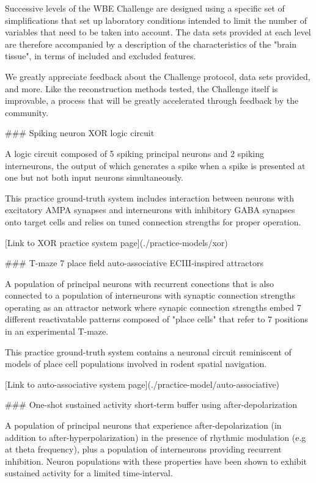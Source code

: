 \documentclass{ldr-article}
\begin{document}
Successive levels of the WBE Challenge are designed using a specific set of simplifications that
set up laboratory conditions intended to limit the number of variables that need to be taken into
account. The data sets provided at each level are therefore accompanied by a description of the
characteristics of the "brain tissue", in terms of included and excluded features.

We greatly appreciate feedback about the Challenge protocol, data sets provided, and more. Like
the reconstruction methods tested, the Challenge itself is improvable, a process that will be greatly
accelerated through feedback by the community.

### Spiking neuron XOR logic circuit

A logic circuit composed of 5 spiking principal neurons and 2 spiking interneurons, the output of
which generates a spike when a spike is presented at one but not both input neurons simultaneously.

This practice ground-truth system includes interaction between neurons with excitatory AMPA
synapses and interneurons with inhibitory GABA synapses onto target cells and relies on tuned
connection strengths for proper operation.

[Link to XOR practice system page](./practice-models/xor)

### T-maze 7 place field auto-associative ECIII-inspired attractors

A population of principal neurons with recurrent conections that is also connected to a population
of interneurons with synaptic connection strengths operating as an attractor network where synapic
connection strengths embed 7 different reactivatable patterns composed of "place cells" that
refer to 7 positions in an experimental T-maze.

This practice ground-truth system contains a neuronal circuit reminiscent of models of
place cell populations involved in rodent spatial navigation.

[Link to auto-associative system page](./practice-model/auto-associative)

### One-shot sustained activity short-term buffer using after-depolarization

A population of principal neurons that experience after-depolarization (in addition to after-hyperpolarization)
in the presence of rhythmic modulation (e.g at theta frequency), plus a population of interneurons providing
recurrent inhibition. Neuron populations with these properties have been shown to exhibit sustained
activity for a limited time-interval.
\end{document}
